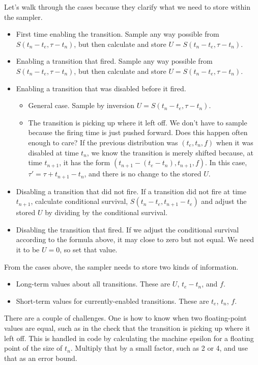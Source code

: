 \documentclass{article}
\begin{document}
Let's walk through the cases because they clarify what we need to store within the sampler.
\begin{itemize}
	\item First time enabling the transition. Sample any way possible from $S(t_n-t_e, \tau-t_n)$, but then calculate and store $U=S(t_n-t_e, \tau-t_n)$.
	\item Enabling a transition that fired. Sample any way possible from $S(t_n-t_e, \tau-t_n)$, but then calculate and store $U=S(t_n-t_e, \tau-t_n)$.
	\item Enabling a transition that was disabled before it fired.
	\begin{itemize}
		\item General case. Sample by inversion $U=S(t_n-t_e, \tau-t_n)$.
		\item The transition is picking up where it left off. We don't have to sample because the firing time is just pushed forward. Does this happen often enough to care? If the previous distribution was $(t_e, t_n, f)$ when it was disabled at time $t_n$, we know the transition is merely shifted because, at time $t_{n+1}$, it has the form $(t_{n+1}-(t_e-t_n), t_{n+1}, f)$. In this case, $\tau' = \tau + t_{n+1}-t_n$, and there is no change to the stored $U$.
	\end{itemize}
	\item Disabling a transition that did not fire. If a transition did not fire at time $t_{n+1}$, calculate conditional survival, $S(t_n-t_e, t_{n+1}-t_e)$ and adjust the stored $U$ by dividing by the conditional survival.
	\item Disabling the transition that fired. If we adjust the conditional survival according to the formula above, it may close to zero but not equal. We need it to be $U=0$, so set that value.
\end{itemize}
From the cases above, the sampler needs to store two kinds of information.
\begin{itemize}
	\item Long-term values about all transitions. These are $U$, $t_e-t_n$, and $f$.
	\item Short-term values for currently-enabled transitions. These are $t_e$, $t_n$, $f$.
\end{itemize}

There are a couple of challenges. One is how to know when two floating-point values are equal, such as in the check that the transition is picking up where it left off. This is handled in code by calculating the machine epsilon for a floating point of the size of $t_n$. Multiply that by a small factor, such as 2 or 4, and use that as an error bound.
\end{document}
